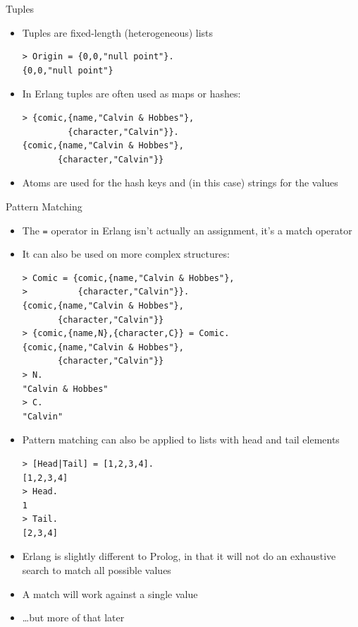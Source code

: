 \documentclass[12pt,xcolor=svgnames]{beamer}
\begin{document}
\begin{frame}[fragile]{Tuples}
\begin{itemize}
\item Tuples are fixed-length (heterogeneous) lists
\begin{Verbatim}
> Origin = {0,0,"null point"}.
{0,0,"null point"}
\end{Verbatim}
\item In Erlang tuples are often used as maps or hashes:
\begin{Verbatim}
> {comic,{name,"Calvin & Hobbes"},
         {character,"Calvin"}}.
{comic,{name,"Calvin & Hobbes"},
       {character,"Calvin"}}
\end{Verbatim}
\item Atoms are used for the hash keys and (in this case) strings for the values
\end{itemize}
\end{frame}

\begin{frame}{Pattern Matching}
\begin{itemize}
\item The \texttt{=} operator in Erlang isn't actually an assignment, it's a match operator
\item It can also be used on more complex structures:
\begin{Verbatim}
> Comic = {comic,{name,"Calvin & Hobbes"},
>          {character,"Calvin"}}.
{comic,{name,"Calvin & Hobbes"},
       {character,"Calvin"}}
> {comic,{name,N},{character,C}} = Comic.
{comic,{name,"Calvin & Hobbes"},
       {character,"Calvin"}}
> N.
"Calvin & Hobbes"
> C.
"Calvin"
\end{Verbatim}
\end{itemize}

\framebreak

\begin{itemize}
\item Pattern matching can also be applied to lists with head and tail elements
\begin{Verbatim}
> [Head|Tail] = [1,2,3,4].
[1,2,3,4]
> Head.
1
> Tail.
[2,3,4]
\end{Verbatim}
\item Erlang is slightly different to Prolog, in that it will not do an exhaustive search to match all possible values
\item A match will work against a single value
\item \ldots but more of that later
\end{itemize}
\end{frame}
\end{document}
